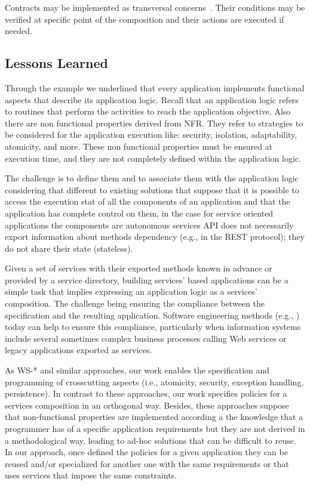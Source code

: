 Contracts may be implemented as transversal concerns~\cite{aspects}.
Their conditions may be verified at specific point of the composition and their actions are executed if needed.

\subsection{Lessons Learned}

Through the example we underlined that every application implements functional aspects that describe its application logic.
Recall that an application logic refers to routines that perform the activities to reach the application objective.
Also there are non functional properties derived from NFR. They refer to strategies to be considered for the application execution like: security, isolation, adaptability, atomicity, and more.
These non functional properties must be ensured at execution time, and they are not completely defined within the application logic.

The challenge is to define them and to associate them with the application logic considering that different to existing solutions that suppose that it is possible to access the execution stat of all the components  of an application and that the application has complete control on them, in the case for service oriented applications  the components are autonomous services
API does not necessarily export information about methods dependency (e.g., in the REST protocol);
they do not share their state (stateless).

Given a set of services with their exported methods known in advance or provided by a  service directory, building services' based applications can be  a simple task that implies expressing an application logic as a services' composition. The challenge being  ensuring the compliance between the specification and the resulting application. Software engineering methods (e.g., \cite{1,2,decastro1,PapazoglouH06}) today can help to ensure this compliance, particularly when information systems include several sometimes complex business processes calling Web services or legacy applications exported as services.

As WS-* and similar approaches, our work enables the specification and programming of crosscutting aspects (i.e., atomicity, security, exception handling, persistence).
In contrast to these approaches, our work specifies policies for a services composition in an orthogonal way. Besides, these approaches suppose that non-functional properties are implemented according a the knowledge that a programmer has of a specific application requirements but they are not derived in a methodological way, leading to ad-hoc solutions that can be difficult to reuse. In our approach, once defined the policies for a given application they can be reused and/or specialized for another one with the same requirements or that uses services that impose the same constraints.